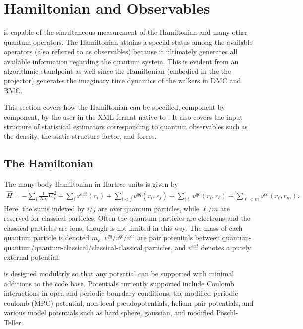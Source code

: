 \chapter{Hamiltonian and Observables}
\label{chap:hamiltobs}


\qmcpack is capable of the simultaneous measurement of the Hamiltonian and many other quantum operators.  The Hamiltonian attains a special status among the available operators (also referred to as observables) because it ultimately generates all available information regarding the quantum system.  This is evident from an algorithmic standpoint as well since the Hamiltonian (embodied in the the projector) generates the imaginary time dynamics of the walkers in DMC and RMC. 

This section covers how the Hamiltonian can be specified, component by component, by the user in the XML format native to \qmcpack.  It also covers the input structure of statistical estimators corresponding to quantum observables such as the density, the static structure factor, and forces.



\section{The Hamiltonian}

The many-body Hamiltonian in Hartree units is given by
\begin{align}
  \hat{H} = -\sum_i\frac{1}{2m_i}\nabla_i^2 + \sum_iv^{ext}(r_i) + \sum_{i<j}v^{qq}(r_i,r_j)   + \sum_{i\ell}v^{qc}(r_i,r_\ell)   + \sum_{\ell<m}v^{cc}(r_\ell,r_m).  
\end{align}
Here, the sums indexed by $i/j$ are over quantum particles, while $\ell/m$ are reserved for classical particles.  Often the quantum particles are electrons and the classical particles are ions, though \qmcpack is not limited in this way.  The mass of each quantum particle is denoted $m_i$, $v^{qq}/v^{qc}/v^{cc}$ are pair potentials between quantum-quantum/quantum-classical/classical-classical particles, and $v^{ext}$ denotes a purely external potential.

\qmcpack is designed modularly so that any potential can be supported with minimal additions to the code base.  Potentials currently supported include Coulomb interactions in open and periodic boundary conditions, the modified periodic coulomb (MPC) potential, non-local pseudopotentials, helium pair potentials, and various model potentials such as hard sphere, gaussian, and modified Poschl-Teller.

